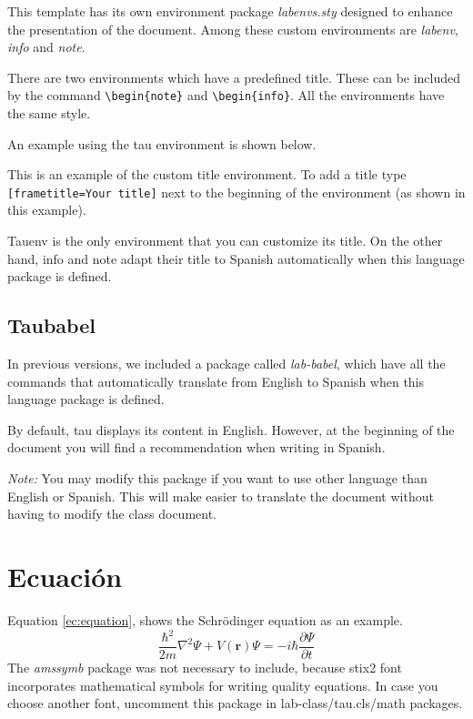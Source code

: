         This template has its own environment package \textit{labenvs.sty} designed to enhance the presentation of the document. Among these custom environments are \textit{labenv}, \textit{info} and \textit{note}.
		
        There are two environments which have a predefined title. These can be included by the command \verb|\begin{note}| and \verb|\begin{info}|. All the environments have the same style.
			
        An example using the tau environment is shown below.
		
    	\begin{labenv}[frametitle=Environment with custom title]
            This is an example of the custom title environment. To add a title type \verb|[frametitle=Your title]| next to the beginning of the environment (as shown in this example).
    	\end{labenv}
		
        Tauenv is the only environment that you can customize its title. On the other hand, info and note adapt their title to Spanish automatically when this language package is defined.
		
    \subsection*{Taubabel}

        In previous versions, we included a package called \textit{lab-babel}, which have all the commands that automatically translate from English to Spanish when this language package is defined. 
        
        By default, tau displays its content in English. However, at the beginning of the document you will find a recommendation when writing in Spanish. 
		
        \textit{Note:} You may modify this package if you want to use other language than English or Spanish. This will make easier to translate the document without having to modify the class document.
		
\section*{Ecuación}

    Equation \ref{ec:equation}, shows the Schrödinger equation as an example. 
	\begin{equation} \label{ec:equation}
		\frac{\hbar^2}{2m}\nabla^2\Psi + V(\mathbf{r})\Psi = -i\hbar \frac{\partial\Psi}{\partial t}
	\end{equation} 
    The \textit{amssymb} package was not necessary to include, because stix2 font incorporates mathematical symbols for writing quality equations. In case you choose another font, uncomment this package in lab-class/tau.cls/math packages.
	
